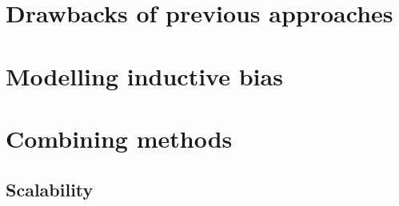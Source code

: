 \section{Drawbacks of previous approaches}
\section{Modelling inductive bias}
\section{Combining methods}
\subsection{Scalability}